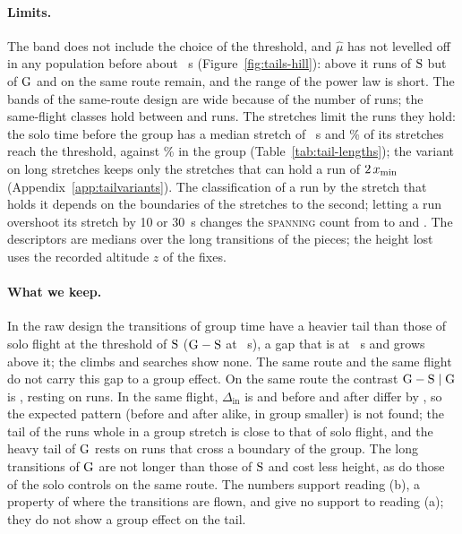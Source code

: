 \paragraph{Limits.} The band does not include the choice of the threshold, and $\hat\mu$ has not levelled off in any population before about \TlXmin~s (Figure~\ref{fig:tails-hill}): above it \TlRawMuSN{} runs of $\mathrm{S}$ but \TlRawMuGN{} of $\mathrm{G}$ and \TlRouteMuGN{} on the same route remain, and the range of the power law is short. The bands of the same-route design are wide because of the number of runs; the same-flight classes hold between \TlFlightMuBeforeN{} and \TlFlightMuAfterN{} runs. The stretches limit the runs they hold: the solo time before the group has a median stretch of \TlStretchMedianBefore~s and \TlStretchShortShareBefore\% of its stretches reach the threshold, against \TlStretchShortShareIn\% in the group (Table~\ref{tab:tail-lengths}); the variant on long stretches keeps only the stretches that can hold a run of $2\,x_{\min}$ (Appendix~\ref{app:tailvariants}). The classification of a run by the stretch that holds it depends on the boundaries of the stretches to the second; letting a run overshoot its stretch by 10 or 30~s changes the \textsc{spanning} count from \TlTolSpanningZero{} to \TlTolSpanningTen{} and \TlTolSpanningThirty. The descriptors are medians over the long transitions of the pieces; the height lost uses the recorded altitude $z$ of the fixes.

\paragraph{What we keep.} In the raw design the transitions of group time have a heavier tail than those of solo flight at the threshold of $\mathrm{S}$ ($\mathrm{G}-\mathrm{S}$ \TlRawGapGS{} \TlRawGapGSBand{} at \TlXmin~s), a gap that is \TlHillGapThousand{} at \TlHillGapThousandXmin~s and grows above it; the climbs and searches show none. The same route and the same flight do not carry this gap to a group effect. On the same route the contrast $\mathrm{G}-\mathrm{S}\mid\mathrm{G}$ is \TlRouteMuCtlG{} \TlRouteMuCtlGBand, resting on \TlRouteMuGN{} runs. In the same flight, $\Delta_\text{in}$ is \TlFlightDeltaIn{} \TlFlightDeltaInBand{} and before and after differ by \TlFlightDeltaAfterBefore{} \TlFlightDeltaAfterBeforeBand, so the expected pattern (before and after alike, in group smaller) is not found; the tail of the runs whole in a group stretch is close to that of solo flight, and the heavy tail of $\mathrm{G}$ rests on runs that cross a boundary of the group. The long transitions of $\mathrm{G}$ are not longer than those of $\mathrm{S}$ and cost less height, as do those of the solo controls on the same route. The numbers support reading (b), a property of where the transitions are flown, and give no support to reading (a); they do not show a group effect on the tail.
